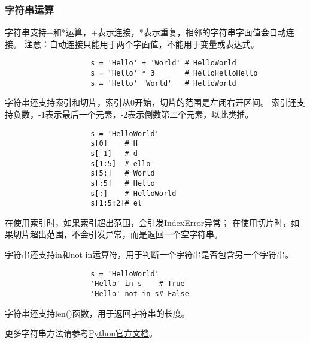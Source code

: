 \documentclass[a4paper, 12pt]{article}
\begin{document}
        \subsubsection{字符串运算}
            字符串支持+和*运算，+表示连接，*表示重复，相邻的字符串字面值会自动连接。
            注意：自动连接只能用于两个字面值，不能用于变量或表达式。\par
            \begin{listing}[h!]
                \begin{verbatim}
                    s = 'Hello' + 'World' # HelloWorld
                    s = 'Hello' * 3       # HelloHelloHello
                    s = 'Hello' 'World'   # HelloWorld
                \end{verbatim}
            \end{listing}
            字符串还支持索引和切片，索引从0开始，切片的范围是左闭右开区间。
            索引还支持负数，-1表示最后一个元素，-2表示倒数第二个元素，以此类推。\par
            \begin{listing}[h!]
                \begin{verbatim}
                    s = 'HelloWorld'
                    s[0]    # H
                    s[-1]   # d
                    s[1:5]  # ello
                    s[5:]   # World
                    s[:5]   # Hello
                    s[:]    # HelloWorld
                    s[1:5:2]# el
                \end{verbatim}
            \end{listing}
            在使用索引时，如果索引超出范围，会引发IndexError异常；
            在使用切片时，如果切片超出范围，不会引发异常，而是返回一个空字符串。\par
            字符串还支持in和not in运算符，用于判断一个字符串是否包含另一个字符串。\par
            \begin{listing}[h!]
                \begin{verbatim}
                    s = 'HelloWorld'
                    'Hello' in s    # True
                    'Hello' not in s# False
                \end{verbatim}
            \end{listing}
            字符串还支持len()函数，用于返回字符串的长度。\par
            更多字符串方法请参考\href{https://docs.python.org/zh-cn/3/library/stdtypes.html#string-methods}{Python官方文档}。
        
\end{document}
